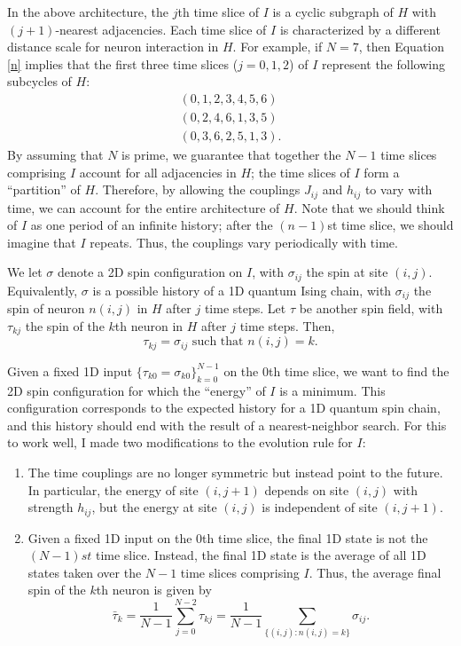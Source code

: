 \documentclass[12pt]{article}
\newcommand{\taubar}{\bar{\tau}}
\begin{document}
In the above architecture, the $j$th time slice of $I$ is a cyclic subgraph of $H$ with $(j+1)$-nearest adjacencies. Each time slice of $I$ is characterized by a different distance scale for neuron interaction in $H$.
For example, if $N=7$, then Equation \eqref{n} implies that the first three time slices ($j=0,1,2$) of $I$ represent the following subcycles of $H$:
\begin{align*}
(0,1,2,3,4,5,6) \\
(0,2,4,6,1,3,5) \\
(0,3,6,2,5,1,3).
\end{align*}
By assuming that $N$ is prime, we guarantee that together the $N-1$ time slices comprising $I$ account for all adjacencies in $H$; the time slices of $I$ form a ``partition'' of $H$. Therefore, by allowing the couplings $J_{ij}$ and $h_{ij}$ to vary with time, we can account for the entire architecture of $H$. Note that we should think of $I$ as one period of an infinite history; after the $(n-1)$st time slice, we should imagine that $I$ repeats. Thus, the couplings vary periodically with time.

We let $\sigma$ denote a 2D spin configuration on $I$, with $\sigma_{ij}$ the spin at site $(i,j)$. Equivalently, $\sigma$ is a possible history of a 1D quantum Ising chain, with $\sigma_{ij}$ the spin of neuron $n(i,j)$ in $H$ after $j$ time steps. Let $\tau$ be another spin field, with $\tau_{kj}$ the spin of the $k$th neuron in $H$ after $j$ time steps. Then,
\begin{equation} \label{tau}
\tau_{kj} = \sigma_{ij}
\mbox{ such that }
n(i,j) = k.
\end{equation}

Given a fixed 1D input $\{\tau_{k0}=\sigma_{k0}\}_{k=0}^{N-1}$ on the $0$th time slice, we want to find the 2D spin configuration for which the ``energy'' of $I$ is a minimum. This configuration corresponds to the expected history for a 1D quantum spin chain, and this history should end with the result of a nearest-neighbor search. For this to work well, I made two modifications to the evolution rule for $I$:
\begin{enumerate}
\item The time couplings are no longer symmetric but instead point to the future. In particular, the energy of site $(i,j+1)$ depends on site $(i,j)$ with strength $h_{ij}$, but the energy at site $(i,j)$ is independent of site $(i,j+1)$.
\item Given a fixed 1D input on the $0$th time slice, the final 1D state is not the $(N-1)st$ time slice. Instead, the final 1D state is the average of all 1D states taken over the $N-1$ time slices comprising $I$. Thus, the average final spin of the $k$th neuron is given by
\begin{equation} \label{average}
\taubar_{k} = \frac{1}{N-1}\sum_{j=0}^{N-2} \tau_{kj}
= \frac{1}{N-1}\sum_{\{(i,j): n(i,j) = k\}} \sigma_{ij}.
\end{equation}
\end{enumerate}
\end{document}

